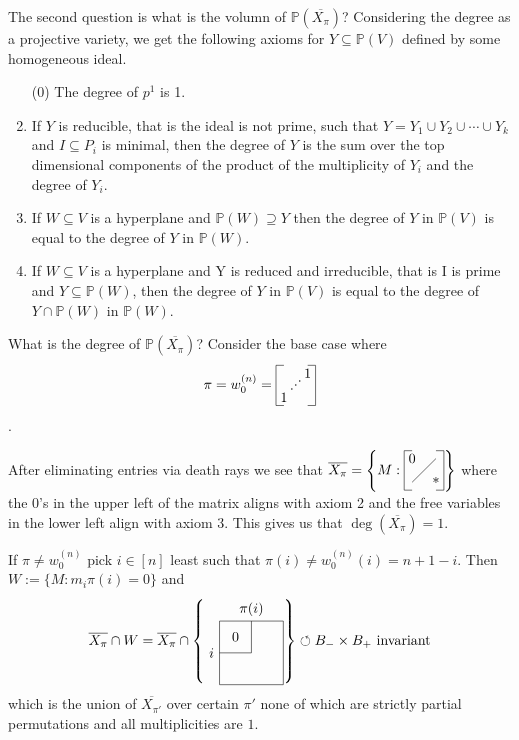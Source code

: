 \documentclass[12pt]{amsart}
\numberwithin{equation}{section}
\theoremstyle{definition}
\numberwithin{figure}{section}
\renewcommand{\P}{\mathbb{P}}
\begin{document}
The second question is what is the volumn of $\P(\overline{X_\pi})$?
Considering the degree as a projective variety, we get the following axioms for $Y\subseteq\P(V)$ defined by some homogeneous ideal.
\begin{enumerate}
	\item[(0)] The degree of $p^1$ is 1.
	\item If $Y$ is reducible, that is the ideal is not prime, such that $Y=Y_1\cup Y_2\cup\cdots\cup Y_k$ and $I\subseteq P_i$ is minimal, then the degree of $Y$ is the sum over the top dimensional components of the product of the multiplicity of $Y_i$ and the degree of $Y_i$.
	\item If $W\subseteq V$ is a hyperplane and $\P(W)\supseteq Y$ then the degree of $Y$ in $\P(V)$ is equal to the degree of $Y$ in $\P(W)$.
	\item If $W\subseteq V$ is a hyperplane and Y is reduced and irreducible, that is I is prime and $Y\subseteq \P(W)$, then the degree of $Y$ in $\P(V)$ is equal to the degree of $Y\cap\P(W)$ in $\P(W)$.
	
\end{enumerate}

What is the degree of $\P(\overline{X_\pi})$? Consider the base case where $$\pi=w_0^{(n)}=
\vcenter{\hbox{\begin{tikzpicture}
			\node at (.2,.2) {1};
			\node at (.8,.8) {1};
			\node at (.4,.4) {$\cdot$};
			\node at (.5,.5) {$\cdot$};
			\node at (.6,.6) {$\cdot$};
			\draw[-] (0,0) to (0,1);
			\draw[-] (0,0) to (.2,0);
			\draw[-] (0,1) to (.2,1);
			\draw[-] (1,0) to (1,1);
			\draw[-] (.8,0) to (1,0);
			\draw [-] (.8,1) to (1,1);
\end{tikzpicture}}}$$.

After eliminating entries via death rays we see that
$\overline{X_\pi}=\left \{ M: \vcenter{\hbox{\begin{tikzpicture}
			\node at (.2,.8) {0};
			\node at (.8,.2) {*};
			\draw[-] (.2,.2) to (.8,.8);
			\draw[-] (0,0) to (0,1);
			\draw[-] (0,0) to (.2,0);
			\draw[-] (0,1) to (.2,1);
			\draw[-] (1,0) to (1,1);
			\draw[-] (.8,0) to (1,0);
			\draw [-] (.8,1) to (1,1);
\end{tikzpicture}}}\right \}$
where the $0$'s in the upper left of the matrix aligns with axiom 2 and the free variables in the lower left align with axiom 3. This gives us that $\deg(\overline{X_\pi})=1$.

If $\pi\neq w_0^{(n)}$ pick $i\in[n]$ least such that $\pi(i)\neq w_0^{(n)}(i)=n+1-i$. Then $W:=\{ M: m_i\pi(i)=0\}$ and $$\overline{X_\pi}\cap W=\overline{X_\pi}\cap\left\{ \vcenter{\hbox{\begin{tikzpicture}
			\node at (0,0) {$i$};
			\node at (1,1.1) {$\pi(i)$};
			\node at (.6,.4) {$0$};
			\draw[-] (.2,.8) to (.2,-.8);
			\draw[-] (.2,-.8) to (1.8,-.8);
			\draw[-] (1.8,-.8) to (1.8,.8);
			\draw[-] (1.8,.8)to (.2,.8);
			\draw[-] (1,0) to (1,.8);
			\draw[-] (.2,0) to (1,0);
\end{tikzpicture}}}\right\}\circlearrowleft B_-\times B_+ \text{ invariant}$$ which is the union of $\overline{X_{\pi'}}$ over certain $\pi'$ none of which are strictly partial permutations and all multiplicities are $1$.
\end{document}
